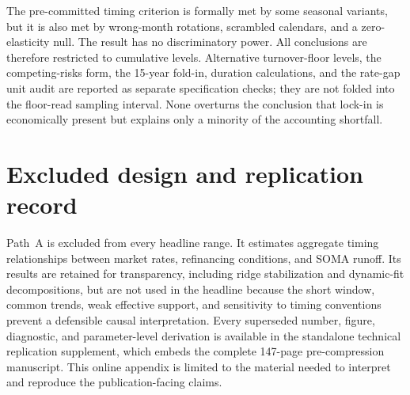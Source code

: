 \documentclass[12pt]{article}
\begin{document}
The pre-committed timing criterion is formally met by some seasonal variants, but
it is also met by wrong-month rotations, scrambled calendars, and a
zero-elasticity null. The result has no discriminatory power. All conclusions are
therefore restricted to cumulative levels. Alternative turnover-floor levels,
the competing-risks form, the 15-year fold-in, duration calculations, and the
rate-gap unit audit are reported as separate specification checks; they are not
folded into the floor-read sampling interval. None overturns the conclusion that
lock-in is economically present but explains only a minority of the accounting
shortfall.

\section{Excluded design and replication record}\label{app:patha-detail}
\label{app:ridge}\label{app:theil}

Path~A is excluded from every headline range. It estimates aggregate timing relationships between market rates, refinancing
conditions, and SOMA runoff. Its results are retained for transparency, including
ridge stabilization and dynamic-fit decompositions, but are not used in the
headline because the short window, common trends, weak effective support, and
sensitivity to timing conventions prevent a defensible causal interpretation.
Every superseded number, figure, diagnostic, and parameter-level derivation is
available in the standalone technical replication supplement, which embeds the
complete 147-page pre-compression manuscript. This online appendix is limited to
the material needed to interpret and reproduce the publication-facing claims.
\end{document}
